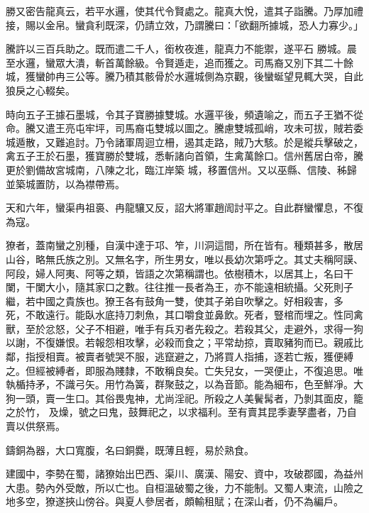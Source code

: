 \begin{pinyinscope}
 勝又密告龍真云，若平水邏，使其代令賢處之。龍真大悅，遣其子詣騰。乃厚加禮接，賜以金帛。蠻貪利既深，仍請立效，乃謂騰曰：「欲翻所據城，恐人力寡少。」



 騰許以三百兵助之。既而遣二千人，銜枚夜進，龍真力不能禦，遂平石
 勝城。晨至水邏，蠻眾大潰，斬首萬餘級。令賢遁走，追而獲之。司馬裔又別下其二十餘城，獲蠻帥冉三公等。騰乃積其骸骨於水邏城側為京觀，後蠻蜒望見輒大哭，自此狼戾之心輟矣。



 時向五子王據石墨城，令其子寶勝據雙城。水邏平後，頻遺喻之，而五子王猶不從命。騰又遣王亮屯牢坪，司馬裔屯雙城以圖之。騰慮雙城孤峭，攻未可拔，賊若委城遁散，又難追討。乃令諸軍周迴立柵，遏其走路，賊乃大駭。於是縱兵擊破之，禽五子王於石墨，獲寶勝於雙城，悉斬諸向首領，生禽萬餘口。信州舊居白帝，騰更於劉備故宮城南，八陳之北，臨江岸築
 城，移置信州。又以巫縣、信陵、秭歸並築城置防，以為襟帶焉。



 天和六年，蠻渠冉祖裛、冉龍驤又反，詔大將軍趙訚討平之。自此群蠻懼息，不復為寇。



 獠者，蓋南蠻之別種，自漢中達于邛、笮，川洞這間，所在皆有。種類甚多，散居山谷，略無氏族之別。又無名字，所生男女，唯以長幼次第呼之。其丈夫稱阿謨、阿段，婦人阿夷、阿等之類，皆語之次第稱謂也。依樹積木，以居其上，名曰干闌，干闌大小，隨其家口之數。往往推一長者為王，亦不能遠相統攝。父死則子繼，若中國之貴族也。獠王各有鼓角一雙，使其子弟自吹擊之。好相殺害，多
 死，不敢遠行。能臥水底持刀刺魚，其口嚼食並鼻飲。死者，豎棺而埋之。性同禽獸，至於忿怒，父子不相避，唯手有兵刃者先殺之。若殺其父，走避外，求得一狗以謝，不復嫌恨。若報怨相攻擊，必殺而食之；平常劫掠，賣取豬狗而已。親戚比鄰，指授相賣。被賣者號哭不服，逃竄避之，乃將買人指捕，逐若亡叛，獲便縛之。但經被縛者，即服為賤隸，不敢稱良矣。亡失兒女，一哭便止，不復追思。唯執楯持矛，不識弓矢。用竹為簧，群聚鼓之，以為音節。能為細布，色至鮮凈。大狗一頭，賣一生口。其俗畏鬼神，尤尚淫祀。所殺之人美鬢髯者，乃剝其面皮，籠之於竹，
 及燥，號之曰鬼，鼓舞祀之，以求福利。至有賣其昆季妻孥盡者，乃自賣以供祭焉。



 鑄銅為器，大口寬腹，名曰銅爨，既薄且輕，易於熟食。



 建國中，李勢在蜀，諸獠始出巴西、渠川、廣漢、陽安、資中，攻破郡國，為益州大患。勢內外受敵，所以亡也。自桓溫破蜀之後，力不能制。又蜀人東流，山險之地多空，獠遂挾山傍谷。與夏人參居者，頗輸租賦；在深山者，仍不為編戶。




\end{pinyinscope}
